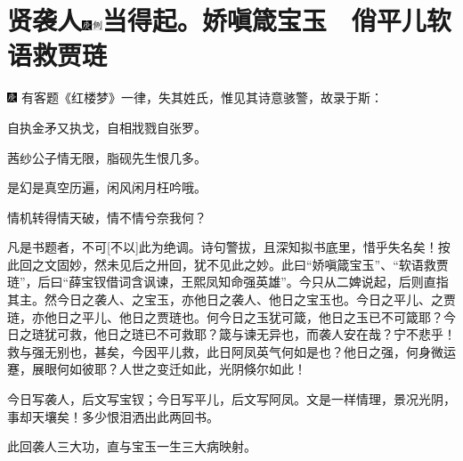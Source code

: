 

\chapter[贤袭人娇嗔箴宝玉\hspace{.5em}　俏平儿软语救贾琏]{\texorpdfstring{贤袭人{\protect\includegraphics[width=3mm]{../Images/00004}\protect\includegraphics[width=3mm]{../Images/00011}\footnotesize \kaishu 当得起。}娇嗔箴宝玉　俏平儿软语救贾琏}{贤袭人庚辰本侧批当得起。娇嗔箴宝玉　俏平儿软语救贾琏}}
{\includegraphics[width=3mm]{../Images/00004}  \kaishu 有客题《红楼梦》一律，失其姓氏，惟见其诗意骇警，故录于斯：}

{\kaishu 自执金矛又执戈，自相戕戮自张罗。}

{\kaishu 茜纱公子情无限，脂砚先生恨几多。}

{\kaishu 是幻是真空历遍，闲风闲月枉吟哦。}

{\kaishu 情机转得情天破，情不情兮奈我何？}

{\kaishu 凡是书题者，不可{[}不以{]}此为绝调。诗句警拔，且深知拟书底里，惜乎失名矣！按此回之文固妙，然未见后之卅回，犹不见此之妙。此曰“娇嗔箴宝玉”、“软语救贾琏”，后曰“薛宝钗借词含讽谏，王熙凤知命强英雄”。今只从二婢说起，后则直指其主。然今日之袭人、之宝玉，亦他日之袭人、他日之宝玉也。今日之平儿、之贾琏，亦他日之平儿、他日之贾琏也。何今日之玉犹可箴，他日之玉已不可箴耶？今日之琏犹可救，他日之琏已不可救耶？箴与谏无异也，而袭人安在哉？宁不悲乎！救与强无别也，甚矣，今因平儿救，此日阿凤英气何如是也？他日之强，何身微运蹇，展眼何如彼耶？人世之变迁如此，光阴倏尔如此！}

{\kaishu 今日写袭人，后文写宝钗；今日写平儿，后文写阿凤。文是一样情理，景况光阴，事却天壤矣！多少恨泪洒出此两回书。}

{\kaishu 此回袭人三大功，直与宝玉一生三大病映射。}

